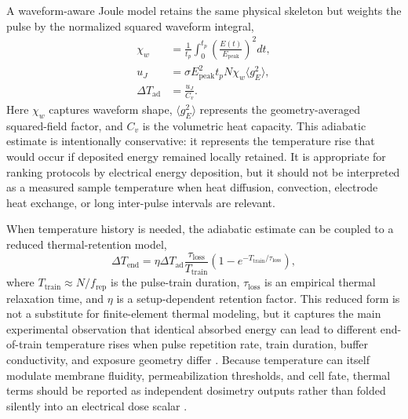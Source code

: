\documentclass[Afour,sagev,times]{sagej}
\begin{document}
A waveform-aware Joule model retains the same physical skeleton but weights the pulse by the normalized squared waveform integral,
\begin{align}
\chi_w &= \frac{1}{t_p}\int_0^{t_p}\left(\frac{E(t)}{E_{\mathrm{peak}}}\right)^2dt,\\
u_J &= \sigma E_{\mathrm{peak}}^{2}t_pN\chi_w\langle g_E^2\rangle,\\
\Delta T_{\mathrm{ad}} &= \frac{u_J}{C_v}.
\end{align}
Here $\chi_w$ captures waveform shape, $\langle g_E^2\rangle$ represents the geometry-averaged squared-field factor, and $C_v$ is the volumetric heat capacity. This adiabatic estimate is intentionally conservative: it represents the temperature rise that would occur if deposited energy remained locally retained. It is appropriate for ranking protocols by electrical energy deposition, but it should not be interpreted as a measured sample temperature when heat diffusion, convection, electrode heat exchange, or long inter-pulse intervals are relevant.

When temperature history is needed, the adiabatic estimate can be coupled to a reduced thermal-retention model,
\begin{equation}
\Delta T_{\mathrm{end}}=\eta\Delta T_{\mathrm{ad}}
\frac{\tau_{\mathrm{loss}}}{T_{\mathrm{train}}}
\left(1-e^{-T_{\mathrm{train}}/\tau_{\mathrm{loss}}}\right),
\end{equation}
where $T_{\mathrm{train}}\approx N/f_{\mathrm{rep}}$ is the pulse-train duration, $\tau_{\mathrm{loss}}$ is an empirical thermal relaxation time, and $\eta$ is a setup-dependent retention factor. This reduced form is not a substitute for finite-element thermal modeling, but it captures the main experimental observation that identical absorbed energy can lead to different end-of-train temperature rises when pulse repetition rate, train duration, buffer conductivity, and exposure geometry differ \cite{orlacchio2023effects,gudvangen2022electroporation}. Because temperature can itself modulate membrane fluidity, permeabilization thresholds, and cell fate, thermal terms should be reported as independent dosimetry outputs rather than folded silently into an electrical dose scalar \cite{kanduser2008temperature,song2011synergistic,song2017thermal,yan2021synergistic,pakhomova2013two}.
\end{document}
